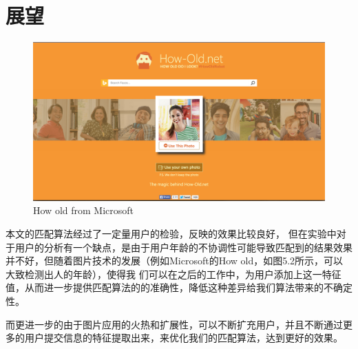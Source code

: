 \section{展望}
\begin{figure}[h]
\begin{minipage}[t]{\linewidth}
\centering
\includegraphics[width=\textwidth]{img/chap5/how_old.png}
\caption{How old from Microsoft\label{Face++API}}
\end{minipage}
\end{figure}
本文的匹配算法经过了一定量用户的检验，反映的效果比较良好，
但在实验中对于用户的分析有一个缺点，是由于用户年龄的不协调性可能导致匹配到的结果效果并不好，但随着图片技术的发展（例如Microsoft的How old，如图5.2所示，可以大致检测出人的年龄），使得我	们可以在之后的工作中，为用户添加上这一特征值，从而进一步提供匹配算法的的准确性，降低这种差异给我们算法带来的不确定性。

而更进一步的由于图片应用的火热和扩展性，可以不断扩充用户，并且不断通过更多的用户提交信息的特征提取出来，来优化我们的匹配算法，达到更好的效果。






